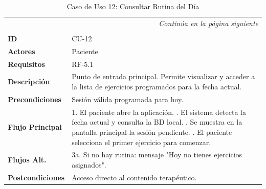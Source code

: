 \clearpage
\begin{longtable}{p{} p{}}
    \toprule
    \endfirsthead
    \toprule
    \endhead
    \midrule
    \multicolumn{2}{r}{\small\itshape Continúa en la página siguiente} \\
    \endfoot
    \bottomrule
    \noalign{\vspace{0.5cm}}
    \caption{Caso de Uso 12: Consultar Rutina del Día} \label{cu:12} \\
    \endlastfoot

    \textbf{ID} & CU-12 \\ \midrule
    \textbf{Actores} & Paciente \\ \midrule
    \textbf{Requisitos} & RF-5.1 \\ \midrule
    \textbf{Descripción} & Punto de entrada principal. Permite visualizar y acceder a la lista de ejercicios programados para la fecha actual. \\ \midrule
    \textbf{Precondiciones} & Sesión válida programada para hoy. \\ \midrule
    \textbf{Flujo Principal} & 
    1. El paciente abre la aplicación. \newline
    2. El sistema detecta la fecha actual y consulta la BD local. \newline
    3. Se muestra en la pantalla principal la sesión pendiente. \newline
    4. El paciente selecciona el primer ejercicio para comenzar. \\ \midrule
    \textbf{Flujos Alt.} & 
    3a. Si no hay rutina: mensaje "Hoy no tienes ejercicios asignados". \\ \midrule
    \textbf{Postcondiciones} & Acceso directo al contenido terapéutico. \\
\end{longtable}


